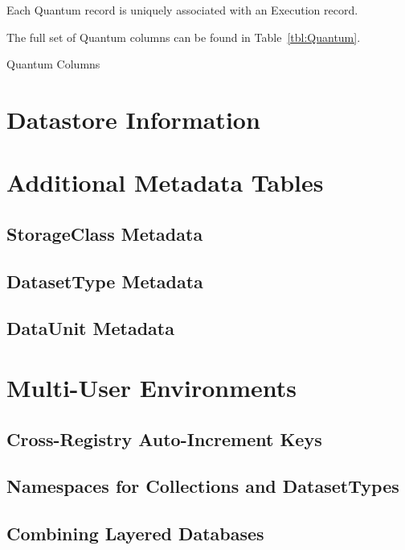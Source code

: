 \documentclass[DM,toc]{lsstdoc}
\newcommand{\coltable}[1]{
    \begin{table}[!htb]
        {\footnotesize
        }
        \caption{#1 Columns}
        \label{tbl:#1}
    \end{table}
}
\begin{document}
Each Quantum record is uniquely associated with an Execution record.

The full set of Quantum columns can be found in Table~\ref{tbl:Quantum}.

\coltable{Quantum}

\section{Datastore Information}
\label{sec:datastore-information}

\section{Additional Metadata Tables}
\label{sec:additional-metadata-tables}

\subsection{StorageClass Metadata}
\label{sec:storageclass-metadata}

\subsection{DatasetType Metadata}
\label{sec:datasettype-metadata}

\subsection{DataUnit Metadata}
\label{sec:dataunit-metadata}


\section{Multi-User Environments}
\label{sec:multi-user-environments}

\subsection{Cross-Registry Auto-Increment Keys}
\label{sec:cross-registry-auto-increment-keys}

\subsection{Namespaces for Collections and DatasetTypes}
\label{sec:namespaces-for-collections-and-datasettypes}

\subsection{Combining Layered Databases}
\label{sec:layered-databases}
\end{document}
